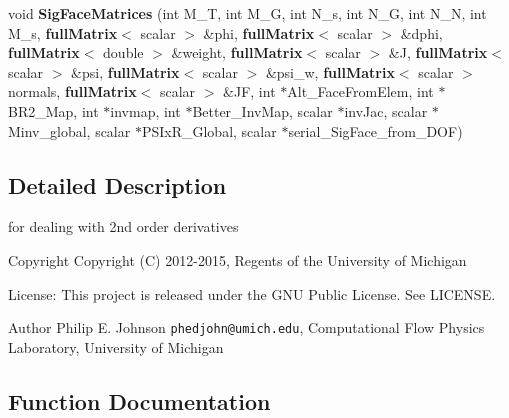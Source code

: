 \begin{DoxyCompactItemize}
\item 
void {\bf Sig\-Face\-Matrices} (int M\-\_\-\-T, int M\-\_\-\-G, int N\-\_\-s, int N\-\_\-\-G, int N\-\_\-\-N, int M\-\_\-s, {\bf full\-Matrix}$<$ scalar $>$ \&phi, {\bf full\-Matrix}$<$ scalar $>$ \&dphi, {\bf full\-Matrix}$<$ double $>$ \&weight, {\bf full\-Matrix}$<$ scalar $>$ \&J, {\bf full\-Matrix}$<$ scalar $>$ \&psi, {\bf full\-Matrix}$<$ scalar $>$ \&psi\-\_\-w, {\bf full\-Matrix}$<$ scalar $>$ normals, {\bf full\-Matrix}$<$ scalar $>$ \&J\-F, int $\ast$Alt\-\_\-\-Face\-From\-Elem, int $\ast$B\-R2\-\_\-\-Map, int $\ast$invmap, int $\ast$Better\-\_\-\-Inv\-Map, scalar $\ast$inv\-Jac, scalar $\ast$Minv\-\_\-global, scalar $\ast$P\-S\-Ix\-R\-\_\-\-Global, scalar $\ast$serial\-\_\-\-Sig\-Face\-\_\-from\-\_\-\-D\-O\-F)
\end{DoxyCompactItemize}


\subsection{Detailed Description}
for dealing with 2nd order derivatives \begin{DoxyCopyright}{Copyright}
Copyright (C) 2012-\/2015, Regents of the University of Michigan 
\end{DoxyCopyright}
\begin{DoxyParagraph}{License\-:}
This project is released under the G\-N\-U Public License. See L\-I\-C\-E\-N\-S\-E. 
\end{DoxyParagraph}
\begin{DoxyAuthor}{Author}
Philip E. Johnson {\tt phedjohn@umich.\-edu}, Computational Flow Physics Laboratory, University of Michigan 
\end{DoxyAuthor}


\subsection{Function Documentation}
